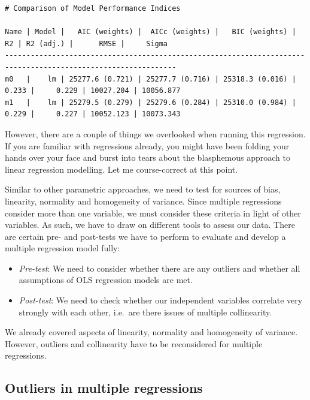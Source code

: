 \documentclass[
  letterpaper,
]{krantz}
\begin{document}
\begin{verbatim}
# Comparison of Model Performance Indices

Name | Model |   AIC (weights) |  AICc (weights) |   BIC (weights) |    R2 | R2 (adj.) |      RMSE |     Sigma
--------------------------------------------------------------------------------------------------------------
m0   |    lm | 25277.6 (0.721) | 25277.7 (0.716) | 25318.3 (0.016) | 0.233 |     0.229 | 10027.204 | 10056.877
m1   |    lm | 25279.5 (0.279) | 25279.6 (0.284) | 25310.0 (0.984) | 0.229 |     0.227 | 10052.123 | 10073.343
\end{verbatim}

However, there are a couple of things we overlooked when running this
regression. If you are familiar with regressions already, you might have
been folding your hands over your face and burst into tears about the
blasphemous approach to linear regression modelling. Let me
course-correct at this point.

Similar to other parametric approaches, we need to test for sources of
bias, linearity, normality and homogeneity of variance. Since multiple
regressions consider more than one variable, we must consider these
criteria in light of other variables. As such, we have to draw on
different tools to assess our data. There are certain pre- and
post-tests we have to perform to evaluate and develop a multiple
regression model fully:

\begin{itemize}
\item
  \emph{Pre-test}: We need to consider whether there are any outliers
  and whether all assumptions of OLS regression models are met.
\item
  \emph{Post-test}: We need to check whether our independent variables
  correlate very strongly with each other, i.e.~are there issues of
  multiple collinearity.
\end{itemize}

We already covered aspects of linearity, normality and homogeneity of
variance. However, outliers and collinearity have to be reconsidered for
multiple regressions.

\subsection{Outliers in multiple
regressions}\label{sec-outliers-in-multiple-regressions}
\end{document}
